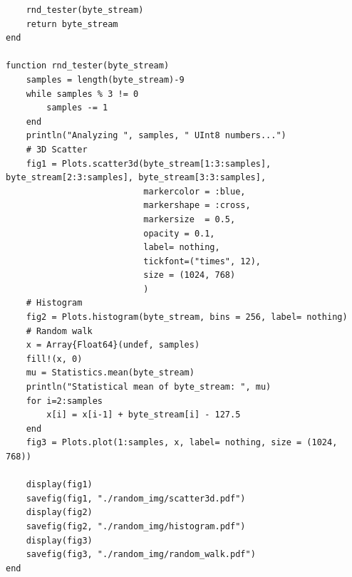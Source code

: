 \documentclass[10pt, final]{article}
\begin{document}
\begin{mdframed}
\begin{lstlisting}
    rnd_tester(byte_stream)
    return byte_stream
end

function rnd_tester(byte_stream)
    samples = length(byte_stream)-9
    while samples % 3 != 0
        samples -= 1
    end
    println("Analyzing ", samples, " UInt8 numbers...")
    # 3D Scatter
    fig1 = Plots.scatter3d(byte_stream[1:3:samples], byte_stream[2:3:samples], byte_stream[3:3:samples], 
                           markercolor = :blue,
                           markershape = :cross,
                           markersize  = 0.5,
                           opacity = 0.1,
                           label= nothing,
                           tickfont=("times", 12),
                           size = (1024, 768)
                           )  
    # Histogram
    fig2 = Plots.histogram(byte_stream, bins = 256, label= nothing)
    # Random walk
    x = Array{Float64}(undef, samples)
    fill!(x, 0)
    mu = Statistics.mean(byte_stream)
    println("Statistical mean of byte_stream: ", mu)
    for i=2:samples
        x[i] = x[i-1] + byte_stream[i] - 127.5
    end
    fig3 = Plots.plot(1:samples, x, label= nothing, size = (1024, 768))

    display(fig1)
    savefig(fig1, "./random_img/scatter3d.pdf")
    display(fig2)
    savefig(fig2, "./random_img/histogram.pdf")
    display(fig3)
    savefig(fig3, "./random_img/random_walk.pdf")
end
    \end{lstlisting}
\end{mdframed} 
\end{document}

